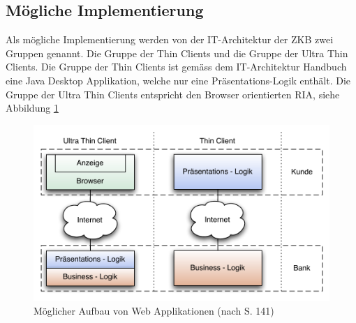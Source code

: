   \subsection{Mögliche Implementierung}
  
  Als mögliche Implementierung werden von der IT-Architektur der \ac{ZKB} zwei
  Gruppen genannt. Die Gruppe der Thin Clients und die Gruppe der Ultra Thin
  Clients. Die Gruppe der Thin Clients ist gemäss dem IT-Architektur Handbuch
  eine Java Desktop Applikation, welche nur eine Präsentations-Logik enthält.
  Die Gruppe der Ultra Thin Clients entspricht den Browser orientierten
  \ac{RIA}, siehe Abbildung \ref{img:zkbWebAnwendungen}
  
  \begin{figure}[hbt]
    \begin{center}
      \includegraphics[width=\textwidth]{./image/zkbWebAnwendungen.pdf}
      \caption{Möglicher Aufbau von Web Applikationen (nach
      \cite{ZkbHandbuchDerItArchitektur} S. 141)}
      \label{img:zkbWebAnwendungen}
    \end{center}
  \end{figure}
  